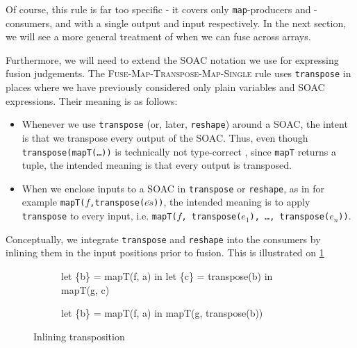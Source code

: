 Of course, this rule is far too specific - it covers only
\texttt{map}-producers and -consumers, and with a single output and
input respectively.  In the next section, we will see a more general
treatment of when we can fuse across arrays.

Furthermore, we will need to extend the SOAC notation we use for
expressing fusion judgements.  The
\textsc{Fuse-Map-Transpose-Map-Single} rule uses \texttt{transpose} in
places where we have previously considered only plain variables and
SOAC expressions.  Their meaning is as follows:

\begin{itemize}
\item Whenever we use \texttt{transpose} (or, later, \texttt{reshape})
  around a SOAC, the intent is that we transpose every output of the
  SOAC.  Thus, even though \texttt{transpose(mapT(\ldots))} is
  technically not type-correct \LO{}, since \texttt{mapT} returns a
  tuple, the intended meaning is that every output is transposed.
\item When we enclose inputs to a SOAC in \texttt{transpose} or
  \texttt{reshape}, as in for example
  \texttt{mapT($f$,transpose($\overline{es}$))}, the intended meaning
  is to apply \texttt{transpose} to every input, i.e.
  \texttt{mapT($f$, transpose($e_{1}$), \ldots, transpose($e_{n}$))}.
\end{itemize}

Conceptually, we integrate \texttt{transpose} and \texttt{reshape}
into the consumers by inlining them in the input positions prior to
fusion.  This is illustrated on \cref{fig:inlining-transpose}

\begin{figure}
\centering
\begin{subfigure}[t]{.5\textwidth}
\begin{colorcode}
let \{b\} = mapT(f, a) in
let \{c\} = transpose(b) in
mapT(g, c)
\end{colorcode}
\end{subfigure}%
\begin{subfigure}[t]{.5\textwidth}
\begin{colorcode}
let \{b\} = mapT(f, a) in
mapT(g, transpose(b))

\end{colorcode}
\end{subfigure}
\caption{Inlining transposition}
\label{fig:inlining-transpose}
\end{figure}

